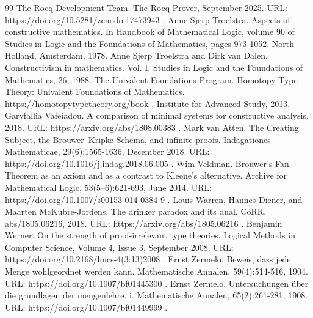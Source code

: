 \documentclass[10pt,a4paper]{amsart}
\begin{document}
\begin{thebibliography}{99}
 The Rocq Development Team. The Rocq Prover, September 2025. URL: https://doi.org/10.5281/zenodo.17473943 .
 Anne Sjerp Troelstra. Aspects of constructive mathematics. In Handbook of Mathematical Logic, volume 90 of Studies in Logic and the Foundations of Mathematics, pages 973-1052. North-Holland, Amsterdam, 1978.
 Anne Sjerp Troelstra and Dirk van Dalen. Constructivism in mathematics. Vol. I. Studies in Logic and the Foundations of Mathematics, 26, 1988.
 The Univalent Foundations Program. Homotopy Type Theory: Univalent Foundations of Mathematics. https://homotopytypetheory.org/book , Institute for Advanced Study, 2013.
 Garyfallia Vafeiadou. A comparison of minimal systems for constructive analysis, 2018. URL: https://arxiv.org/abs/1808.00383 .
 Mark van Atten. The Creating Subject, the Brouwer–Kripke Schema, and infinite proofs. Indagationes Mathematicae, 29(6):1565-1636, December 2018. URL: https://doi.org/10.1016/j.indag.2018.06.005 .
 Wim Veldman. Brouwer’s Fan Theorem as an axiom and as a contrast to Kleene’s alternative. Archive for Mathematical Logic, 53(5–6):621-693, June 2014. URL: https://doi.org/10.1007/s00153-014-0384-9 .
 Louis Warren, Hannes Diener, and Maarten McKubre-Jordens. The drinker paradox and its dual. CoRR, abs/1805.06216, 2018. URL: https://arxiv.org/abs/1805.06216 .
 Benjamin Werner. On the strength of proof-irrelevant type theories. Logical Methods in Computer Science, Volume 4, Issue 3, September 2008. URL: https://doi.org/10.2168/lmcs-4(3:13)2008 .
 Ernst Zermelo. Beweis, dass jede Menge wohlgeordnet werden kann. Mathematische Annalen, 59(4):514-516, 1904. URL: https://doi.org/10.1007/bf01445300 .
 Ernst Zermelo. Untersuchungen über die grundlagen der mengenlehre. i. Mathematische Annalen, 65(2):261-281, 1908. URL: https://doi.org/10.1007/bf01449999 .
\end{thebibliography}
\end{document}
